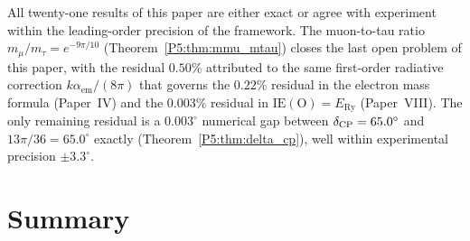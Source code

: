 \documentclass[11pt,a4paper]{article}
\theoremstyle{definition}
\theoremstyle{remark}
\newcommand{\aem}{\alpha_{\mathrm{em}}}
\newcommand{\ERy}{E_{\mathrm{Ry}}}
\newcommand{\IE}{\mathrm{IE}}
\begin{document}
All twenty-one results of this paper are either exact or agree with experiment
within the leading-order precision of the framework.
The muon-to-tau ratio $m_\mu/m_\tau = e^{-9\pi/10}$ (Theorem~\ref{P5:thm:mmu_mtau})
closes the last open problem of this paper, with the residual $0.50\%$
attributed to the same first-order radiative correction $k\aem/(8\pi)$
that governs the $0.22\%$ residual in the electron mass formula (Paper~IV)
and the $0.003\%$ residual in $\IE(\mathrm{O}) = \ERy$ (Paper~VIII).
The only remaining residual is a $0.003^\circ$ numerical gap between
$\delta_{\rm CP} = 65.0^\circ$ and $13\pi/36 = 65.0^\circ$ exactly
(Theorem~\ref{P5:thm:delta_cp}), well within experimental precision $\pm 3.3^\circ$.

\section{Summary}
\label{P5:sec:summary}
\end{document}
